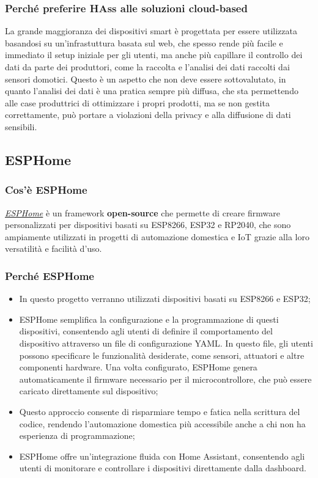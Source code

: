 \documentclass[11pt, a4paper]{article}
\begin{document}
\subsubsection{Perché preferire HAss alle soluzioni cloud-based}
La grande maggioranza dei dispositivi smart è progettata per essere utilizzata basandosi su
un'infrastuttura basata sul web, che spesso rende più facile e immediato il setup iniziale per gli utenti,
ma anche più capillare il controllo dei dati da parte dei produttori, come la raccolta e l'analisi dei dati
raccolti dai sensori domotici. Questo è un aspetto che non deve essere sottovalutato, in quanto
l'analisi dei dati è una pratica sempre più diffusa, che sta permettendo alle case produttrici di
ottimizzare i propri prodotti, ma se non gestita correttamente, può portare a violazioni della privacy
e alla diffusione di dati sensibili.

\subsection{ESPHome}

\subsubsection{Cos'è ESPHome}
\href{https://esphome.io}{\textit{ESPHome}} è un framework \textbf{open-source} che permette di creare firmware personalizzati per dispositivi basati su ESP8266, ESP32 e RP2040,
che sono ampiamente utilizzati in progetti di automazione domestica e IoT grazie alla loro versatilità e facilità d'uso.

\subsubsection{Perché ESPHome}
\begin{itemize}
    \item In questo progetto verranno utilizzati dispositivi basati su ESP8266 e ESP32;
    \item ESPHome semplifica la configurazione e la programmazione di questi dispositivi, 
    consentendo agli utenti di definire il comportamento del dispositivo attraverso un file di configurazione YAML.
    In questo file, gli utenti possono specificare le funzionalità desiderate, come sensori, attuatori e altre componenti hardware. 
    Una volta configurato, ESPHome genera automaticamente il firmware necessario per il microcontrollore, che può essere caricato direttamente sul dispositivo;
    \item Questo approccio consente di risparmiare tempo e fatica nella scrittura del codice, rendendo l'automazione domestica più accessibile anche a chi non ha esperienza di programmazione;
    \item ESPHome offre un'integrazione fluida con Home Assistant, consentendo agli utenti di monitorare e controllare i dispositivi direttamente dalla dashboard.

\end{itemize}
\end{document}
